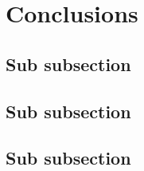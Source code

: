 \section{Conclusions}
\label{sec61}


\subsection{Sub subsection}
\label{sec611}


\subsection{Sub subsection}
\label{sec612}

\subsection{Sub subsection}
\label{sec613}

